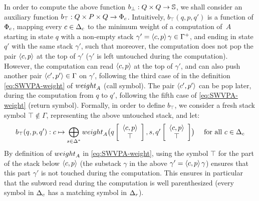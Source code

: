 \noindent
In order to compute the above function $b_\bot : Q \times Q \to \mathbb{S}$, 
we shall consider an auxiliary function $b_\top :  Q \times P \times Q \to \Phic$.
%
Intuitively, $b_\top(q, p, q')$ is a function of $\Phic$, 
mapping every $c \in \Deltac$ to 
the minimum weight of a computation of~$A$
starting in state $q$ with a non-empty stack 
$\gamma' = \<c, p> \, \gamma \in \Gamma^+$, 
and ending in state $q'$ with the same stack $\gamma'$,
such that moreover, 
the computation does not pop the pair $\<c, p>$ at the top of $\gamma'$
(\ie $\gamma'$ is left untouched during the computation).
However, the computation can read $\<c, p>$ at the top of $\gamma'$,
and can also push another pair $\< c', p'> \in \Gamma$ on $\gamma'$,
following the third case of 
in the definition \eqref{eq:SWVPA-weight} of $\weight_A$ (call symbol).
The pair $\< c', p'>$ can be pop later, during the computation from $q$ to $q'$,  
following the fifth case of \eqref{eq:SWVPA-weight} (return symbol). 
%
%
Formally, in order to define $b_\top$, we consider 
a fresh stack symbol $\top \notin \Gamma$,   %
representing the above untouched stack, and let:
%
\begin{equation}\label{eq:btop}
  b_\top(q, p, q') : c \mapsto \bigoplus_{s\in \Delta^*}
  \textstyle
  \weight_A\bigl(\configup{q}{\< c, p> \stackup \top }, s, \configup{q'}{\<c, p> \stackup \top}\bigr)
\quad  
\mathrm{~for~all~} c \in \Deltac  
\end{equation}
%
By definition of $\weight_A$ in \eqref{eq:SWVPA-weight}, 
using the symbol $\top$ for the part of the stack below $\<c, p>$
(\ie the substack $\gamma$ in the above $\gamma' = \<c, p> \, \gamma$)
ensures that this part $\gamma'$ is not touched during the computation.
%
This ensures in particular that the subword 
read during the computation is well parenthesized
(every symbol in $\Deltac$ has a matching symbol in $\Deltar$).


